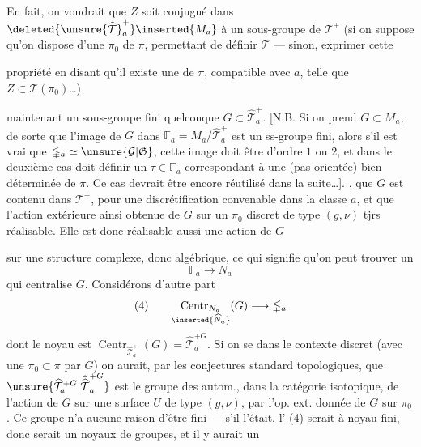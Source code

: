 En fait, on voudrait que $Z$ soit conjugué dans $\deleted{\unsure{\widehat{\mathcal T}}_a^+}\inserted{M_a}$ à un sous-groupe de  $\mathcal T^+$  (si on suppose qu'on dispose d'une   $\pi_0$ de $\pi$, permettant de définir $\mathcal T$ --- sinon,  exprimer cette

propriété en disant qu'il existe une   de $\pi$, compatible avec $a$, telle que $Z\subset\mathcal T(\pi_0)$\ldots)

 maintenant un sous-groupe fini quelconque $G\subset\widehat{\mathcal T}_a^+$. [N.B. Si on prend  $G\subset M_a$, de sorte que l'image de $G$ dans $\mathbb{\Gamma}_a=M_a/\widehat{\mathcal T}_a^+$ est un ss-groupe fini, alors s'il  est vrai que $\mathbb{\Gamma}_a\simeq\unsure{\mathcal G|\mathfrak G}$,  cette image doit être d'ordre $1$ ou $2$, et dans le deuxième cas doit  définir un $\tau\in\mathbb{\Gamma}_a$ correspondant à une \uline{} (pas orientée) bien déterminée de $\pi$. Ce cas devrait être encore réutilisé dans la suite\ldots].   , que $G$ est contenu dans $\mathcal T^+$,  pour une discrétification convenable dans la classe $a$, et que l'action extérieure ainsi obtenue de $G$ sur un $\pi_0$ discret de type $(g,\nu)$  tjrs \uline{réalisable}. Elle est donc réalisable aussi  une action de $G$

sur une structure complexe, donc algébrique, ce qui signifie qu'on peut trouver un  
\[
\mathbb{\Gamma}_a\longrightarrow N_a
\]
qui centralise $G$. Considérons d'autre part
\[
(4)\qquad
\underset{\inserted{\widehat N_a}}{\operatorname{Centr}_{N_a}}(G)
\longrightarrow\mathbb{\Gamma}_a
\]
dont le noyau est $\operatorname{Centr}_{\widehat{\mathcal T}_a^+}(G)=\widehat{\mathcal T}_a^{+G}$.
Si on se  dans le contexte discret  (avec une  $\pi_0\subset\pi$  par $G$) on aurait, par les conjectures standard topologiques, que $\unsure{\widehat{\mathcal T}_a^{+G}|\widehat{\widehat{\mathcal T}}_a^{+G}}$ est le groupe des autom., dans la catégorie isotopique, de l'action de $G$ sur une surface $U$ de type $(g,\nu)$,  par l'op. ext. donnée de $G$ sur $\pi_0$. Ce groupe n'a aucune raison d'être fini --- s'il l'était, l' (4) serait à noyau fini, donc serait un   noyaux de groupes, et il y aurait un

